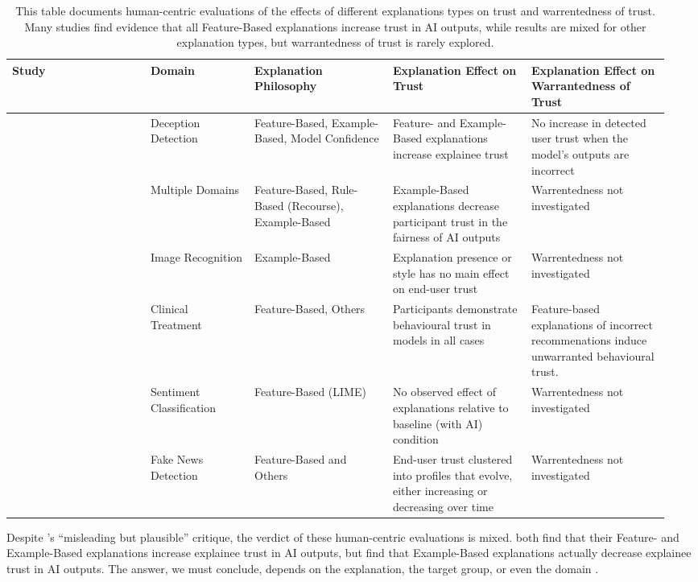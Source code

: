 \begin{table}[htbp]
    \centering
    \caption{This table documents human-centric evaluations of the effects of different explanations types on trust and warrentedness of trust. Many studies find evidence that all Feature-Based explanations increase trust in AI outputs, while results are mixed for other explanation types, but warrantedness of trust is rarely explored.}
    \begin{tabular}{p{0.2\linewidth} p{0.15\linewidth} p{0.2\linewidth} p{0.2\linewidth} p{0.2\linewidth}}
        \toprule
        Study & Domain & Explanation Philosophy & Explanation Effect on Trust & Explanation Effect on Warrantedness of Trust \\
        \midrule
        \textcite{Lai-and-Tan} & Deception Detection & Feature-Based, Example-Based, Model Confidence & Feature- and Example-Based explanations increase explainee trust & No increase in detected user trust when the model's outputs are incorrect \\
        \textcite{Binns-et-al} & Multiple Domains & Feature-Based, Rule-Based (Recourse), Example-Based & Example-Based explanations decrease participant trust in the fairness of AI outputs & Warrentedness not investigated \\
        \textcite{Ford-et-al} & Image Recognition & Example-Based & Explanation presence or style has no main effect on end-user trust & Warrentedness not investigated \\
        \textcite{Jacobs-et-al} & Clinical Treatment & Feature-Based, Others & Participants demonstrate behavioural trust in models in all cases & Feature-based explanations of incorrect recommenations induce unwarranted behavioural trust. \\
        \textcite{Bansal-et-al} & Sentiment Classification & Feature-Based (LIME) & No observed effect of explanations relative to baseline (with AI) condition & Warrentedness not investigated \\
        \textcite{Mohseni-et-al} & Fake News Detection & Feature-Based and Others & End-user trust clustered into profiles that evolve, either increasing or decreasing over time & Warrentedness not investigated \\
        \bottomrule
    \end{tabular}
    \label{tab:studies}
\end{table}

Despite \textcite{Lipton}'s ``misleading but plausible'' critique, the verdict of these human-centric evaluations is mixed. \textcite{Lai-and-Tan,Jacobs-et-al} both find that their Feature- and Example-Based explanations increase explainee trust in AI outputs, but \textcite{Binns-et-al} find that Example-Based explanations actually decrease explainee trust in AI outputs. The answer, we must conclude, depends on the explanation, the target group, or even the domain \cite{Mohseni-et-al}. 

